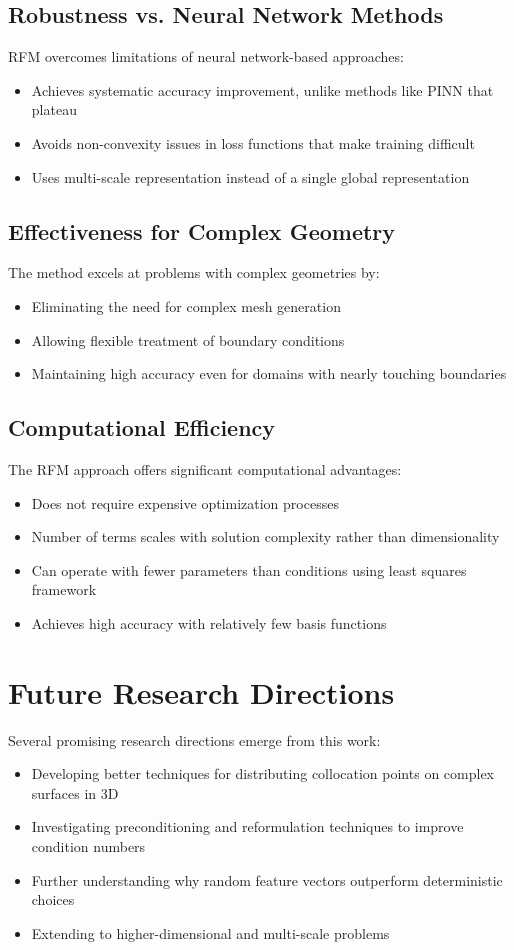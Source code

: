 \documentclass[11pt]{article}
\begin{document}
\subsection{Robustness vs. Neural Network Methods}
RFM overcomes limitations of neural network-based approaches:
\begin{itemize}
    \item Achieves systematic accuracy improvement, unlike methods like PINN that plateau
    \item Avoids non-convexity issues in loss functions that make training difficult
    \item Uses multi-scale representation instead of a single global representation
\end{itemize}

\subsection{Effectiveness for Complex Geometry}
The method excels at problems with complex geometries by:
\begin{itemize}
    \item Eliminating the need for complex mesh generation
    \item Allowing flexible treatment of boundary conditions
    \item Maintaining high accuracy even for domains with nearly touching boundaries
\end{itemize}

\subsection{Computational Efficiency}
The RFM approach offers significant computational advantages:
\begin{itemize}
    \item Does not require expensive optimization processes
    \item Number of terms scales with solution complexity rather than dimensionality
    \item Can operate with fewer parameters than conditions using least squares framework
    \item Achieves high accuracy with relatively few basis functions
\end{itemize}

\section{Future Research Directions}
Several promising research directions emerge from this work:
\begin{itemize}
    \item Developing better techniques for distributing collocation points on complex surfaces in 3D
    \item Investigating preconditioning and reformulation techniques to improve condition numbers
    \item Further understanding why random feature vectors outperform deterministic choices
    \item Extending to higher-dimensional and multi-scale problems
\end{itemize}
\end{document}
